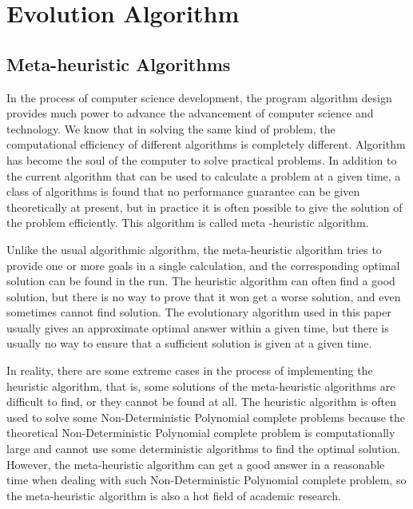 
\section{Evolution Algorithm}

\subsection{Meta-heuristic Algorithms}
%
In the process of computer science development, the program algorithm
design provides much power to advance the advancement of computer
science and technology. We know that in solving the same kind of
problem, the computational efficiency of different algorithms is
completely different.  Algorithm has become the soul of the computer
to solve practical problems. In addition to the current algorithm that
can be used to calculate a problem at a given time, a class of
algorithms is found that no performance guarantee can be given
theoretically at present, but in practice it is often possible to give
the solution of the problem efficiently. This algorithm is called meta
-heuristic algorithm.


Unlike the usual algorithmic algorithm, the meta-heuristic algorithm
tries to provide one or more goals in a single calculation, and the
corresponding optimal solution can be found in the run. The heuristic
algorithm can often find a good solution, but there is no way to prove
that it won get a worse solution, and even sometimes cannot find
solution. The evolutionary algorithm used in this paper usually gives
an approximate optimal answer within a given time, but there is
usually no way to ensure that a sufficient solution is given at a
given time.


In reality, there are some extreme cases in the process of
implementing the heuristic algorithm, that is, some solutions of the
meta-heuristic algorithms are difficult to find, or they cannot be
found at all. The heuristic algorithm is often used to solve some
Non-Deterministic Polynomial complete problems because the theoretical
Non-Deterministic Polynomial complete problem is computationally large
and cannot use some deterministic algorithms to find the optimal
solution. However, the meta-heuristic algorithm can get a good answer
in a reasonable time when dealing with such Non-Deterministic
Polynomial complete problem, so the meta-heuristic algorithm is also a
hot field of academic research.


